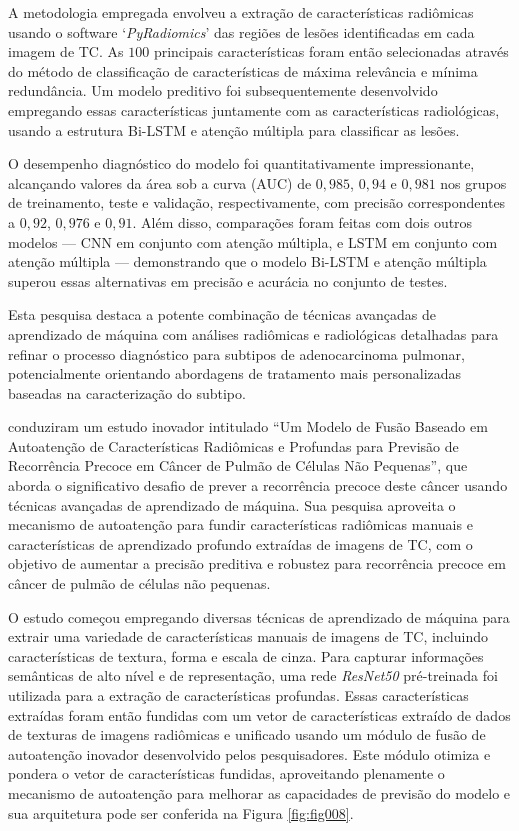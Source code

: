 A metodologia empregada envolveu a extração de características radiômicas usando o software `\textit{PyRadiomics}' das regiões de lesões identificadas em cada imagem de \gls{TC}. As $100$ principais características foram então selecionadas através do método de classificação de características de máxima relevância e mínima redundância. Um modelo preditivo foi subsequentemente desenvolvido empregando essas características juntamente com as características radiológicas, usando a estrutura Bi-LSTM e atenção múltipla para classificar as lesões.

O desempenho diagnóstico do modelo foi quantitativamente impressionante, alcançando valores da área sob a curva (AUC) de $0,985$, $0,94$ e $0,981$ nos grupos de treinamento, teste e validação, respectivamente, com precisão correspondentes a $0,92$, $0,976$ e $0,91$. Além disso, comparações foram feitas com dois outros modelos — \gls{CNN} em conjunto com atenção múltipla, e LSTM em conjunto com atenção múltipla — demonstrando que o modelo Bi-LSTM e atenção múltipla superou essas alternativas em precisão e acurácia no conjunto de testes.

Esta pesquisa destaca a potente combinação de técnicas avançadas de aprendizado de máquina com análises radiômicas e radiológicas detalhadas para refinar o processo diagnóstico para subtipos de adenocarcinoma pulmonar, potencialmente orientando abordagens de tratamento mais personalizadas baseadas na caracterização do subtipo.

  conduziram um estudo inovador intitulado ``Um Modelo de Fusão Baseado em Autoatenção de Características Radiômicas e Profundas para Previsão de Recorrência Precoce em Câncer de Pulmão de Células Não Pequenas'', que aborda o significativo desafio de prever a recorrência precoce deste câncer usando técnicas avançadas de aprendizado de máquina. Sua pesquisa aproveita o mecanismo de autoatenção para fundir características radiômicas manuais e características de aprendizado profundo extraídas de imagens de \gls{TC}, com o objetivo de aumentar a precisão preditiva e robustez para recorrência precoce em câncer de pulmão de células não pequenas.

O estudo começou empregando diversas técnicas de aprendizado de máquina para extrair uma variedade de características manuais de imagens de \gls{TC}, incluindo características de textura, forma e escala de cinza. Para capturar informações semânticas de alto nível e de representação, uma rede \textit{ResNet50} pré-treinada foi utilizada para a extração de características profundas. Essas características extraídas foram então fundidas com um vetor de características extraído de dados de texturas de imagens radiômicas e unificado usando um módulo de fusão de autoatenção inovador desenvolvido pelos pesquisadores. Este módulo otimiza e pondera o vetor de características fundidas, aproveitando plenamente o mecanismo de autoatenção para melhorar as capacidades de previsão do modelo e sua arquitetura pode ser conferida na Figura \ref{fig:fig008}.

